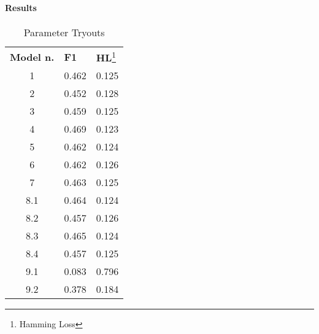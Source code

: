\begin{frame}
	\frametitle{\secttitle}
	\framesubtitle{Results}
	\begin{table}[]
\centering
\caption{Parameter Tryouts}
\label{my-label}
\begin{tabular}{cll}
\multicolumn{1}{l}{\textbf{Model n.}} & \textbf{F1} & \textbf{HL}\footnote{Hamming Loss} \\
1                                                & 0.462       & 0.125                 \\
2                                                & 0.452       & 0.128                 \\
3                                                & 0.459       & 0.125                 \\
4                                                & 0.469       & 0.123                 \\
5                                                & 0.462       & 0.124                 \\
6                                                & 0.462       & 0.126                 \\
7                                                & 0.463       & 0.125                 \\
8.1                                              & 0.464       & 0.124                 \\
8.2                                              & 0.457       & 0.126                 \\
8.3                                              & 0.465       & 0.124                 \\
8.4                                              & 0.457       & 0.125                 \\
9.1                                              & 0.083       & 0.796                 \\
9.2                                              & 0.378       & 0.184                
\end{tabular}
\end{table}
\end{frame}

